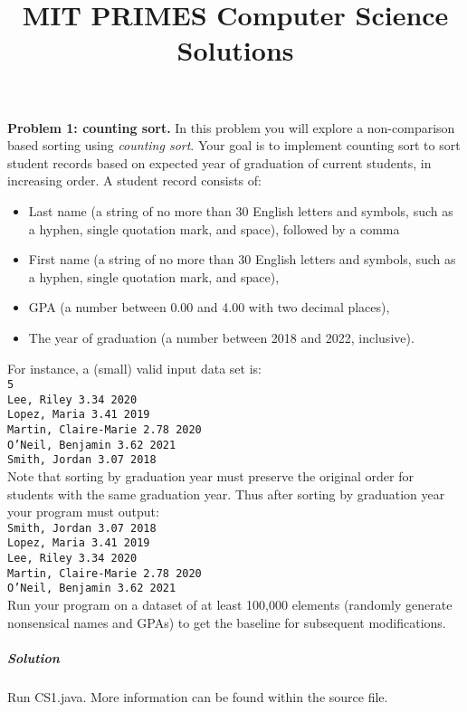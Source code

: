 \documentclass[a4paper]{amsart}
\title{MIT PRIMES Computer Science Solutions}
\newenvironment*{problem}{}{}
\def\code#1{\texttt{#1}}
\begin{document}
	\maketitle
	\begin{problem}
		\textbf{Problem 1: counting sort.} In this problem you will explore a non-comparison based sorting using \textit{counting sort}. Your goal is to implement counting sort to sort student records based on expected year of graduation of current students, in increasing order. A student record consists of:
		\begin{itemize}
			\item Last name (a string of no more than 30 English letters and symbols, such as a hyphen, single quotation mark, and space), followed by a comma
			\item First name (a string of no more than 30 English letters and symbols, such as a hyphen, single quotation mark, and space),
			\item GPA (a number between 0.00 and 4.00 with two decimal places),
			\item The year of graduation (a number between 2018 and 2022, inclusive).
		\end{itemize}
		For instance, a (small) valid input data set is:
		\code{
			\\ 5 \\
			Lee, Riley 3.34 2020 \\
			Lopez, Maria 3.41 2019 \\
			Martin, Claire-Marie 2.78 2020 \\
			O’Neil, Benjamin 3.62 2021 \\
			Smith, Jordan 3.07 2018 \\}
		Note that sorting by graduation year must preserve the original order for students with the same graduation year. Thus after sorting by graduation year your program must output:
		\code{
			\\ Smith, Jordan 3.07 2018 \\
			Lopez, Maria 3.41 2019 \\
			Lee, Riley 3.34 2020 \\
			Martin, Claire-Marie 2.78 2020 \\
			O’Neil, Benjamin 3.62 2021 \\}
		Run your program on a dataset of at least 100,000 elements (randomly generate
		nonsensical names and GPAs) to get the baseline for subsequent modifications.
		
		\subparagraph{\textbf{Solution}} Run CS1.java. More information can be found within the source file.
	\end{problem}
\end{document}
